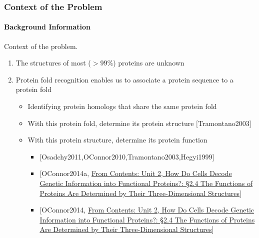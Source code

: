 \documentclass[xcolor={usenames,dvipsnames},hyperref={hyperindex,bookmarks}]{beamer}
\begin{document}
\frame
{
	\frametitle{Context of the Problem}
	\framesubtitle{Background Information}

	Context of the problem.
	\begin{enumerate}
	\item The structures of most ($>99\%$) proteins are unknown %
	\item Protein fold recognition enables us to associate a protein sequence to a protein fold
		\begin{itemize}	%
		\item Identifying protein homologs that share the same protein fold
		\item With this protein fold, determine its protein structure $[$Tramontano2003$]$
		\item With this protein structure, determine its protein function	%
			\begin{itemize}
			\item $[$Osadchy2011,OConnor2010,Tramontano2003,Hegyi1999$]$
			\item $[$OConnor2014a, \href{https://www.nature.com/scitable/ebooks/cell-biology-for-seminars-14760004/122995569/}{From Contents: Unit 2, How Do Cells Decode Genetic Information into Functional Proteins?: \S2.4 The Functions of Proteins Are Determined by Their Three-Dimensional Structures}$]$
			\item $[$OConnor2014, \href{ https://www.nature.com/scitable/ebooks/essentials-of-cell-biology-14749010/122996920/}{From Contents: Unit 2, How Do Cells Decode Genetic Information into Functional Proteins?: \S2.4 The Functions of Proteins Are Determined by Their Three-Dimensional Structures}$]$
			\end{itemize}
		\end{itemize}
	\end{enumerate}



}


\end{document}
